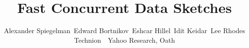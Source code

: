 \documentclass[twocolumn,10pt]{article}
\begin{document}
\title{Fast Concurrent Data Sketches} 


\author{
Alexander Spiegelman\footnotemark[1] \ 
Edward Bortnikov\footnotemark[2]  \
Eshcar Hillel\footnotemark[2] \ 
Idit Keidar\footnotemark[1]\footnotemark[2] \ 
Lee Rhodes\footnotemark[2]\\ 
\footnotemark[1] Technion\ \ \footnotemark[2] Yahoo Research, Oath
}


\date{}


\maketitle







%

            




%





\end{document}
